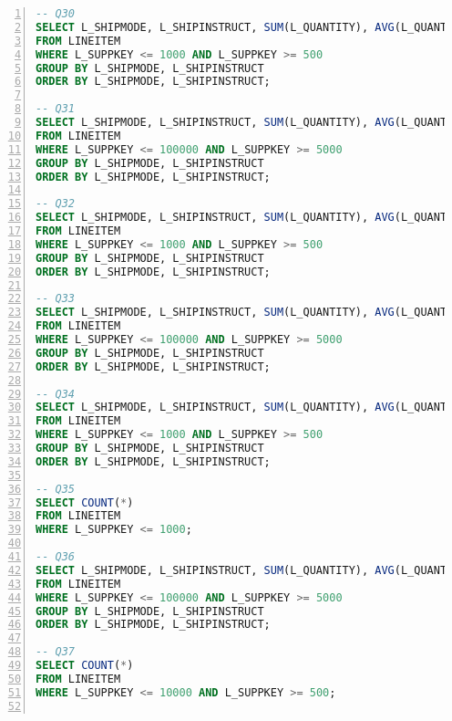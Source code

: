 \begin{lstlisting}[language=sql,numbers=left,xleftmargin=2em,multicols=2,basicstyle=\ttfamily\tiny]
-- Q30
SELECT L_SHIPMODE, L_SHIPINSTRUCT, SUM(L_QUANTITY), AVG(L_QUANTITY), SUM(L_QUANTITY - L_EXTENDEDPRICE), SUM(L_QUANTITY * L_EXTENDEDPRICE - 1), COUNT(*)
FROM LINEITEM
WHERE L_SUPPKEY <= 1000 AND L_SUPPKEY >= 500
GROUP BY L_SHIPMODE, L_SHIPINSTRUCT
ORDER BY L_SHIPMODE, L_SHIPINSTRUCT;

-- Q31
SELECT L_SHIPMODE, L_SHIPINSTRUCT, SUM(L_QUANTITY), AVG(L_QUANTITY), SUM(L_QUANTITY - L_EXTENDEDPRICE), SUM(L_QUANTITY * L_EXTENDEDPRICE - 1), COUNT(*)
FROM LINEITEM
WHERE L_SUPPKEY <= 100000 AND L_SUPPKEY >= 5000
GROUP BY L_SHIPMODE, L_SHIPINSTRUCT
ORDER BY L_SHIPMODE, L_SHIPINSTRUCT;

-- Q32
SELECT L_SHIPMODE, L_SHIPINSTRUCT, SUM(L_QUANTITY), AVG(L_QUANTITY), SUM(L_QUANTITY - L_EXTENDEDPRICE), SUM(L_QUANTITY * L_EXTENDEDPRICE - 1), AVG(L_DISCOUNT * (L_TAX +1)), AVG(L_QUANTITY / (L_TAX +1)), COUNT(*)
FROM LINEITEM
WHERE L_SUPPKEY <= 1000 AND L_SUPPKEY >= 500
GROUP BY L_SHIPMODE, L_SHIPINSTRUCT
ORDER BY L_SHIPMODE, L_SHIPINSTRUCT;

-- Q33
SELECT L_SHIPMODE, L_SHIPINSTRUCT, SUM(L_QUANTITY), AVG(L_QUANTITY), SUM(L_QUANTITY - L_EXTENDEDPRICE), SUM(L_QUANTITY * L_EXTENDEDPRICE - 1), AVG(L_DISCOUNT * (L_TAX +1)), AVG(L_QUANTITY / (L_TAX +1)), COUNT(*)
FROM LINEITEM
WHERE L_SUPPKEY <= 100000 AND L_SUPPKEY >= 5000
GROUP BY L_SHIPMODE, L_SHIPINSTRUCT
ORDER BY L_SHIPMODE, L_SHIPINSTRUCT;

-- Q34
SELECT L_SHIPMODE, L_SHIPINSTRUCT, SUM(L_QUANTITY), AVG(L_QUANTITY), SUM(L_QUANTITY - L_EXTENDEDPRICE), SUM(L_QUANTITY * L_EXTENDEDPRICE - 1), AVG(L_DISCOUNT * (L_TAX +1)), AVG(L_QUANTITY / (L_TAX +1)), SUM(L_TAX)/SUM(L_EXTENDEDPRICE), SUM(L_QUANTITY * 0.5), AVG(L_QUANTITY * 0.2), COUNT(*)
FROM LINEITEM
WHERE L_SUPPKEY <= 1000 AND L_SUPPKEY >= 500
GROUP BY L_SHIPMODE, L_SHIPINSTRUCT
ORDER BY L_SHIPMODE, L_SHIPINSTRUCT;

-- Q35
SELECT COUNT(*)
FROM LINEITEM
WHERE L_SUPPKEY <= 1000;

-- Q36
SELECT L_SHIPMODE, L_SHIPINSTRUCT, SUM(L_QUANTITY), AVG(L_QUANTITY), SUM(L_QUANTITY - L_EXTENDEDPRICE), SUM(L_QUANTITY * L_EXTENDEDPRICE - 1), AVG(L_DISCOUNT * (L_TAX +1)), AVG(L_QUANTITY / (L_TAX +1)), SUM(L_TAX)/SUM(L_EXTENDEDPRICE), SUM(L_QUANTITY * 0.5), AVG(L_QUANTITY * 0.2), COUNT(*)
FROM LINEITEM
WHERE L_SUPPKEY <= 100000 AND L_SUPPKEY >= 5000
GROUP BY L_SHIPMODE, L_SHIPINSTRUCT
ORDER BY L_SHIPMODE, L_SHIPINSTRUCT;

-- Q37
SELECT COUNT(*)
FROM LINEITEM
WHERE L_SUPPKEY <= 10000 AND L_SUPPKEY >= 500;


\end{lstlisting}

